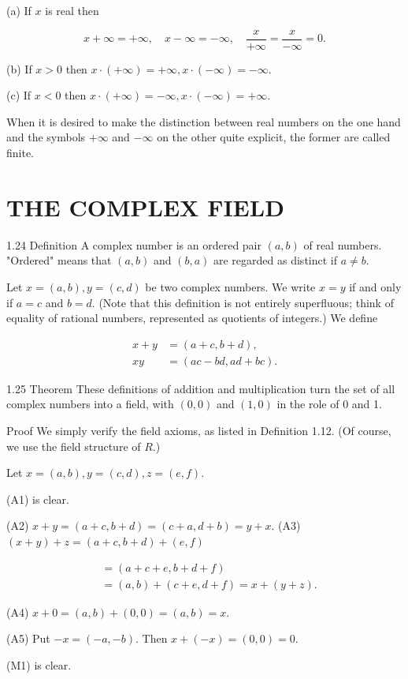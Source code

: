 \documentclass[10pt]{article}
\begin{document}
(a) If $x$ is real then

$$
x+\infty=+\infty, \quad x-\infty=-\infty, \quad \frac{x}{+\infty}=\frac{x}{-\infty}=0 .
$$

(b) If $x>0$ then $x \cdot(+\infty)=+\infty, x \cdot(-\infty)=-\infty$.

(c) If $x<0$ then $x \cdot(+\infty)=-\infty, x \cdot(-\infty)=+\infty$.

When it is desired to make the distinction between real numbers on the one hand and the symbols $+\infty$ and $-\infty$ on the other quite explicit, the former are called finite.

\section{THE COMPLEX FIELD}
1.24 Definition A complex number is an ordered pair $(a, b)$ of real numbers. "Ordered" means that $(a, b)$ and $(b, a)$ are regarded as distinct if $a \neq b$.

Let $x=(a, b), y=(c, d)$ be two complex numbers. We write $x=y$ if and only if $a=c$ and $b=d$. (Note that this definition is not entirely superfluous; think of equality of rational numbers, represented as quotients of integers.) We define

$$
\begin{aligned}
x+y & =(a+c, b+d), \\
x y & =(a c-b d, a d+b c) .
\end{aligned}
$$

1.25 Theorem These definitions of addition and multiplication turn the set of all complex numbers into a field, with $(0,0)$ and $(1,0)$ in the role of 0 and 1.

Proof We simply verify the field axioms, as listed in Definition 1.12. (Of course, we use the field structure of $R$.)

Let $x=(a, b), y=(c, d), z=(e, f)$.

(A1) is clear.

(A2) $x+y=(a+c, b+d)=(c+a, d+b)=y+x$. (A3) $(x+y)+z=(a+c, b+d)+(e, f)$

$$
\begin{aligned}
& =(a+c+e, b+d+f) \\
& =(a, b)+(c+e, d+f)=x+(y+z) .
\end{aligned}
$$

(A4) $x+0=(a, b)+(0,0)=(a, b)=x$.

(A5) Put $-x=(-a,-b)$. Then $x+(-x)=(0,0)=0$.

(M1) is clear.
\end{document}
